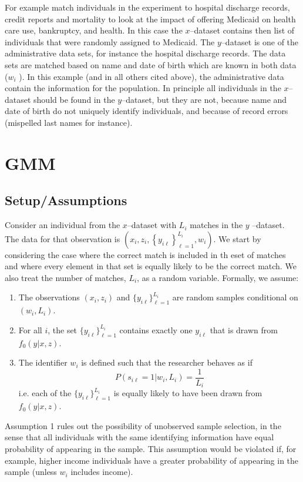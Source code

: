 \documentclass[12pt]{article}
\renewcommand{\cite}{\citeasnoun}
\newcommand{\yiL}{\{y_{i\ell}\}_{\ell=1}^{L_i}}
\begin{document}
For example \cite{Finkelstein2012} match individuals in the experiment to
hospital discharge records, credit reports and mortality to look at the
impact of offering Medicaid on health care use, bankruptcy, and health. In
this case the $x$--dataset contains then list of individuals that were
randomly assigned to Medicaid. The $y$--dataset is one of the administrative
data sets, for instance the hospital discharge records. The data sets are
matched based on name and date of birth which are known in both data ($w_{i}$%
). In this example (and in all others cited above), the administrative data
contain the information for the population. In principle all individuals in
the $x$--dataset should be found in the $y$--dataset, but they are not,
because name and date of birth do not uniquely identify individuals, and
because of record errors (mispelled last names for instance).

\section{GMM}
\subsection{Setup/Assumptions}

Consider an individual from the $x$--dataset with $L_{i}$ matches in the $y$%
--dataset. The data for that observation is $\left( x_{i},z_{i},\left\{
y_{i\ell}\right\} _{\ell =1}^{L_{i}},w_{i}\right) $.  We start by considering the case where the correct match is included in th eset of matches and where every element in that set is equally likely to be the correct match. We also treat the number of matches, $L_i$, as a random variable.  Formally, we assume:
 
 \begin{enumerate}
     \item The observations $(x_i,z_i)$ and $\{y_{i\ell}\}_{\ell=1}^{L_i}$ are random samples conditional on $(w_i,L_i)$.
     \item For all $i$, the set $\yiL$ contains exactly one $y_{i\ell}$ that is drawn from $f_0(y | x,z)$.  
     \item  The identifier $w_i$ is defined such that the researcher behaves as if
$$P(s_{i\ell}=1 | w_i, L_i) = \frac{1}{L_i}$$ 
i.e. each of the $\yiL$ is equally likely to have been drawn from $f_0(y | x,z)$. 
 \end{enumerate}

Assumption 1 rules out the possibility of unobserved sample selection, in the sense that all individuals with the same identifying information have equal probability of appearing in the sample.  This assumption would be violated if, for example, higher income individuals have a greater probability of appearing in the sample (unless $w_i$ includes income). 
\end{document}
